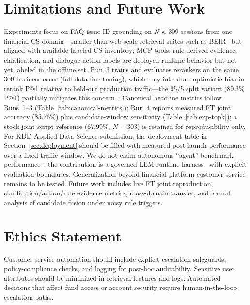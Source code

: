 \documentclass[sigconf,review]{acmart}
\begin{document}
\section{Limitations and Future Work}
Experiments focus on FAQ issue-ID grounding on $N{\approx}309$ sessions from one financial CS domain---smaller than web-scale retrieval suites such as BEIR~\cite{thakur2021beir} but aligned with available labeled CS inventory; MCP tools, rule-derived evidence, clarification, and dialogue-action labels are deployed runtime behavior but not yet labeled in the offline set.
Run~3 trains and evaluates rerankers on the same 309 business cases (full-data fine-tuning), which may introduce optimistic bias in rerank P@1 relative to held-out production traffic---the 95/5 split variant (89.3\% P@1) partially mitigates this concern~\cite{xiao2024bge}.
Canonical headline metrics follow Runs~1--3 (Table~\ref{tab:canonical-metrics}); Run~4 reports measured FT joint accuracy (85.76\%) plus candidate-window sensitivity (Table~\ref{tab:exp-topk}); a stock joint script reference (67.99\%, $N{=}303$) is retained for reproducibility only.
For KDD Applied Data Science submission, the deployment table in Section~\ref{sec:deployment} should be filled with measured post-launch performance over a fixed traffic window.
We do not claim autonomous ``agent'' benchmark performance~\cite{singh2025agenticrag}; the contribution is a governed LLM runtime harness~\cite{langgraph2024,chung2023instructtods,zhou2026externalization} with explicit evaluation boundaries.
Generalization beyond financial-platform customer service remains to be tested.
Future work includes live FT joint reproduction, clarification/action/rule evidence metrics, cross-domain transfer, and formal analysis of candidate fusion under noisy rule triggers.

\section*{Ethics Statement}
Customer-service automation should include explicit escalation safeguards, policy-compliance checks, and logging for post-hoc auditability. Sensitive user attributes should be minimized in retrieval features and logs. Automated decisions that affect fund access or account security require human-in-the-loop escalation paths.



\end{document}
